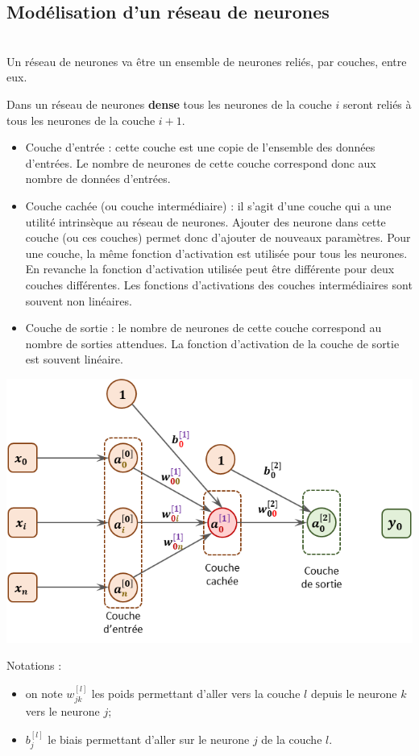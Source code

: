 \subsection{Modélisation d'un réseau de neurones} 

\begin{defi}[Couches] ~\\

Un réseau de neurones va être un ensemble de neurones reliés, par couches, entre eux. 

Dans un réseau de neurones \textbf{dense} tous les neurones de la couche $i$ seront reliés à tous les neurones de la couche $i+1$.

\begin{itemize}
\item Couche d'entrée : cette couche est une copie de l'ensemble des données d'entrées. Le nombre de neurones de cette couche correspond donc aux nombre de données d'entrées.
\item Couche cachée (ou couche intermédiaire) : il s'agit d'une couche qui a une utilité intrinsèque au réseau de neurones. Ajouter des neurone dans cette couche (ou ces couches) permet donc d'ajouter de nouveaux paramètres.  Pour une couche, la même fonction d'activation est utilisée pour tous les neurones. En revanche la fonction d'activation utilisée peut être différente pour deux couches différentes. Les fonctions d'activations des couches intermédiaires sont souvent non linéaires.
\item Couche de sortie : le nombre de neurones de cette couche correspond au nombre de sorties attendues. La fonction d'activation de la couche de sortie est souvent linéaire.
\end{itemize}
\begin{center}
\includegraphics[width=.8\linewidth]{images/fig_04}
\end{center}

Notations : 
\begin{itemize}
\item on note $w^{[l]}_{jk}$ les poids permettant d'aller vers la couche $l$ depuis le neurone $k$ vers le neurone $j$;
\item $b^{[l]}_{j}$ le biais permettant d'aller sur le neurone $j$ de la couche $l$.
\end{itemize}
\end{defi}


